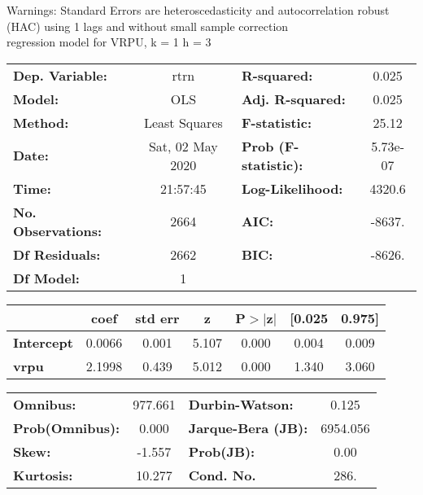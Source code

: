 Warnings: \newline
 [1] Standard Errors are heteroscedasticity and autocorrelation robust (HAC) using 1 lags and without small sample correction\\ 

regression model for VRPU, k = 1 h = 3\begin{center}
\begin{tabular}{lclc}
\toprule
\textbf{Dep. Variable:}    &       rtrn       & \textbf{  R-squared:         } &     0.025   \\
\textbf{Model:}            &       OLS        & \textbf{  Adj. R-squared:    } &     0.025   \\
\textbf{Method:}           &  Least Squares   & \textbf{  F-statistic:       } &     25.12   \\
\textbf{Date:}             & Sat, 02 May 2020 & \textbf{  Prob (F-statistic):} &  5.73e-07   \\
\textbf{Time:}             &     21:57:45     & \textbf{  Log-Likelihood:    } &    4320.6   \\
\textbf{No. Observations:} &        2664      & \textbf{  AIC:               } &    -8637.   \\
\textbf{Df Residuals:}     &        2662      & \textbf{  BIC:               } &    -8626.   \\
\textbf{Df Model:}         &           1      & \textbf{                     } &             \\
\bottomrule
\end{tabular}
\begin{tabular}{lcccccc}
                   & \textbf{coef} & \textbf{std err} & \textbf{z} & \textbf{P$> |$z$|$} & \textbf{[0.025} & \textbf{0.975]}  \\
\midrule
\textbf{Intercept} &       0.0066  &        0.001     &     5.107  &         0.000        &        0.004    &        0.009     \\
\textbf{vrpu}      &       2.1998  &        0.439     &     5.012  &         0.000        &        1.340    &        3.060     \\
\bottomrule
\end{tabular}
\begin{tabular}{lclc}
\textbf{Omnibus:}       & 977.661 & \textbf{  Durbin-Watson:     } &    0.125  \\
\textbf{Prob(Omnibus):} &   0.000 & \textbf{  Jarque-Bera (JB):  } & 6954.056  \\
\textbf{Skew:}          &  -1.557 & \textbf{  Prob(JB):          } &     0.00  \\
\textbf{Kurtosis:}      &  10.277 & \textbf{  Cond. No.          } &     286.  \\
\bottomrule
\end{tabular}
\end{center}

